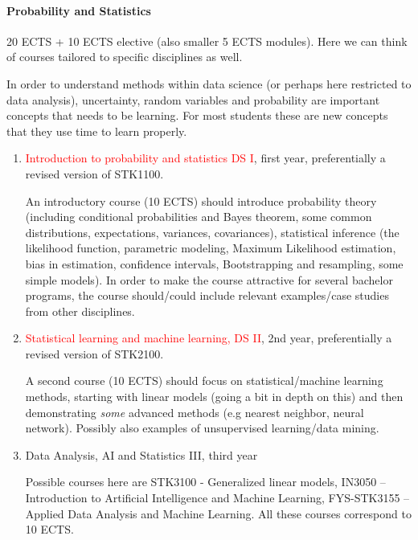 \documentclass[oneside,final,10pt]{article}
\begin{document}
\paragraph{Probability and Statistics}
20 ECTS + 10 ECTS elective (also smaller 5 ECTS modules). Here we can think of courses tailored to specific disciplines as well. 

 In order to understand methods within data science (or perhaps here restricted to data analysis), uncertainty, random variables and probability are important concepts that needs to be learning. For most students these are new concepts that they use time to learn properly. 
\begin{enumerate}
    \item \textcolor{red}{Introduction to probability and statistics DS I}, first year, preferentially a revised version of STK1100.
    
    An introductory course (10 ECTS) should introduce probability theory (including conditional probabilities and Bayes theorem, some common distributions, expectations, variances, covariances), statistical inference (the likelihood function, parametric modeling, Maximum Likelihood estimation, bias in estimation, confidence intervals, Bootstrapping and resampling, some simple models). In order to make the course attractive for several bachelor programs, the course should/could include relevant examples/case studies from other disciplines.
    
    \item \textcolor{red}{Statistical learning and machine learning, DS II}, 2nd year, preferentially a revised version of  STK2100.
    
    A second course (10 ECTS) should focus on statistical/machine learning methods, starting with linear models (going a bit in depth on this) and then demonstrating \emph{some} advanced methods (e.g nearest neighbor, neural network). Possibly also examples of unsupervised learning/data mining.

    \item Data Analysis, AI and Statistics III, third year
    
    Possible courses here are STK3100 - Generalized linear models,  
IN3050 – Introduction to Artificial Intelligence and Machine Learning, FYS-STK3155 – Applied Data Analysis and Machine Learning. All these courses correspond to 10 ECTS.
\end{enumerate}
\end{document}
